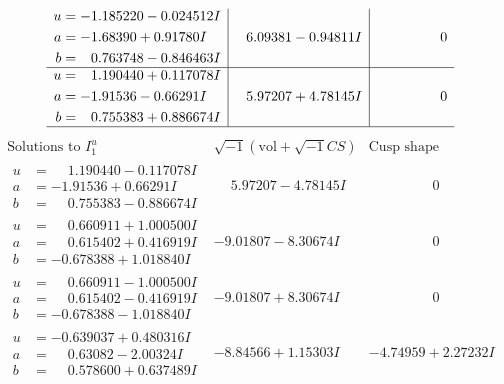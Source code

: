 \documentclass[1p]{elsarticle_modified}
\theoremstyle{definition}
\newcommand{\I}{\sqrt{-1}}
\begin{document}
$$\begin{array}{c|c|c}
\begin{aligned}
u &= -1.185220 - 0.024512 I \\
a &= -1.68390 + 0.91780 I \\
b &= \phantom{-}0.763748 - 0.846463 I\end{aligned}
 & \phantom{-}6.09381 - 0.94811 I & \phantom{-0.000000 } 0 \\ \hline\begin{aligned}
u &= \phantom{-}1.190440 + 0.117078 I \\
a &= -1.91536 - 0.66291 I \\
b &= \phantom{-}0.755383 + 0.886674 I\end{aligned}
 & \phantom{-}5.97207 + 4.78145 I & \phantom{-0.000000 } 0\\
 \hline 
 \end{array}$$\newpage$$\begin{array}{c|c|c}  
\text{Solutions to }I^u_{1}& \I (\text{vol} + \sqrt{-1}CS) & \text{Cusp shape}\\
 \hline 
\begin{aligned}
u &= \phantom{-}1.190440 - 0.117078 I \\
a &= -1.91536 + 0.66291 I \\
b &= \phantom{-}0.755383 - 0.886674 I\end{aligned}
 & \phantom{-}5.97207 - 4.78145 I & \phantom{-0.000000 } 0 \\ \hline\begin{aligned}
u &= \phantom{-}0.660911 + 1.000500 I \\
a &= \phantom{-}0.615402 + 0.416919 I \\
b &= -0.678388 + 1.018840 I\end{aligned}
 & -9.01807 - 8.30674 I & \phantom{-0.000000 } 0 \\ \hline\begin{aligned}
u &= \phantom{-}0.660911 - 1.000500 I \\
a &= \phantom{-}0.615402 - 0.416919 I \\
b &= -0.678388 - 1.018840 I\end{aligned}
 & -9.01807 + 8.30674 I & \phantom{-0.000000 } 0 \\ \hline\begin{aligned}
u &= -0.639037 + 0.480316 I \\
a &= \phantom{-}0.63082 - 2.00324 I \\
b &= \phantom{-}0.578600 + 0.637489 I\end{aligned}
 & -8.84566 + 1.15303 I & -4.74959 + 2.27232 I \\ \hline\begin{aligned}

\end{aligned}
\end{array}$$
\end{document}
